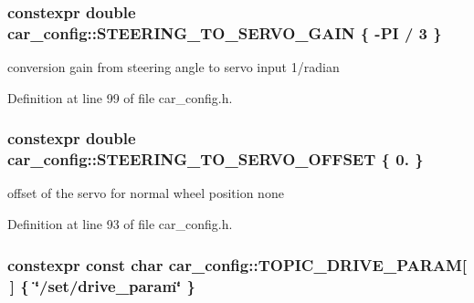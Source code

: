 \subsubsection[{\texorpdfstring{S\+T\+E\+E\+R\+I\+N\+G\+\_\+\+T\+O\+\_\+\+S\+E\+R\+V\+O\+\_\+\+G\+A\+IN}{STEERING_TO_SERVO_GAIN}}]{\setlength{\rightskip}{0pt plus 5cm}constexpr double car\+\_\+config\+::\+S\+T\+E\+E\+R\+I\+N\+G\+\_\+\+T\+O\+\_\+\+S\+E\+R\+V\+O\+\_\+\+G\+A\+IN \{ -\/{\bf PI} / 3 \}}\hypertarget{namespacecar__config_aa8ab85fe7b8ab728f34d15028f114d86}{}\label{namespacecar__config_aa8ab85fe7b8ab728f34d15028f114d86}


conversion gain from steering angle to servo input  1/radian 



Definition at line 99 of file car\+\_\+config.\+h.

\subsubsection[{\texorpdfstring{S\+T\+E\+E\+R\+I\+N\+G\+\_\+\+T\+O\+\_\+\+S\+E\+R\+V\+O\+\_\+\+O\+F\+F\+S\+ET}{STEERING_TO_SERVO_OFFSET}}]{\setlength{\rightskip}{0pt plus 5cm}constexpr double car\+\_\+config\+::\+S\+T\+E\+E\+R\+I\+N\+G\+\_\+\+T\+O\+\_\+\+S\+E\+R\+V\+O\+\_\+\+O\+F\+F\+S\+ET \{ 0. \}}\hypertarget{namespacecar__config_abb6ef746663276219b321683dfbb8896}{}\label{namespacecar__config_abb6ef746663276219b321683dfbb8896}


offset of the servo for normal wheel position  none 



Definition at line 93 of file car\+\_\+config.\+h.

\subsubsection[{\texorpdfstring{T\+O\+P\+I\+C\+\_\+\+D\+R\+I\+V\+E\+\_\+\+P\+A\+R\+AM}{TOPIC_DRIVE_PARAM}}]{\setlength{\rightskip}{0pt plus 5cm}constexpr const char car\+\_\+config\+::\+T\+O\+P\+I\+C\+\_\+\+D\+R\+I\+V\+E\+\_\+\+P\+A\+R\+AM\mbox{[}$\,$\mbox{]} \{ \char`\"{}/set/drive\+\_\+param\char`\"{} \}}\hypertarget{namespacecar__config_a329dea882fb03eb1cec1af42977fa0c6}{}\label{namespacecar__config_a329dea882fb03eb1cec1af42977fa0c6}


